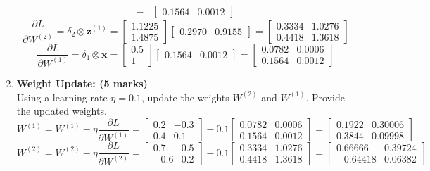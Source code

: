 \documentclass[12pt]{article}
\begin{document}
\begin{enumerate}[font=\Large]
$$\begin{aligned}
			      =         & \begin{bmatrix} 0.1564 & 0.0012 \end{bmatrix}
		      \end{aligned}
	      $$
	      $$\dfrac{\partial L}{\partial W^{(2)}}=\delta_2\otimes\mathbf{z}^{(1)}=\begin{bmatrix} 1.1225 \\ 1.4875 \end{bmatrix}\begin{bmatrix} 0.2970 & 0.9155 \end{bmatrix}=\begin{bmatrix} 0.3334 & 1.0276\\ 0.4418 & 1.3618 \end{bmatrix}$$
	      $$\dfrac{\partial L}{\partial W^{(1)}}=\delta_1\otimes\mathbf{x}=\begin{bmatrix} 0.5 \\ 1 \end{bmatrix}\begin{bmatrix} 0.1564 & 0.0012 \end{bmatrix}=\begin{bmatrix} 0.0782 & 0.0006\\ 0.1564 & 0.0012 \end{bmatrix}$$
	\item \textbf{Weight Update: (5 marks)}\\
	      Using a learning rate $\eta=0.1$, update the weights $W^{(2)}$ and $W^{(1)}$. Provide the updated weights.
	      $$W^{(1)}=W^{(1)}-\eta\dfrac{\partial L}{\partial W^{(1)}}=\begin{bmatrix}
			      0.2 & -0.3 \\
			      0.4 & 0.1
		      \end{bmatrix}
		      -0.1\begin{bmatrix} 0.0782 & 0.0006\\ 0.1564 & 0.0012 \end{bmatrix}=\begin{bmatrix} 0.1922 & 0.30006\\ 0.3844 & 0.09998 \end{bmatrix}$$
	      $$W^{(2)}=W^{(2)}-\eta\dfrac{\partial L}{\partial W^{(2)}}= \begin{bmatrix}
			      0.7  & 0.5 \\
			      -0.6 & 0.2
		      \end{bmatrix}-0.1\begin{bmatrix} 0.3334 & 1.0276\\ 0.4418 & 1.3618 \end{bmatrix}=\begin{bmatrix} 0.66666 & 0.39724\\ -0.64418 & 0.06382 \end{bmatrix}$$


\end{enumerate}
\end{document}
